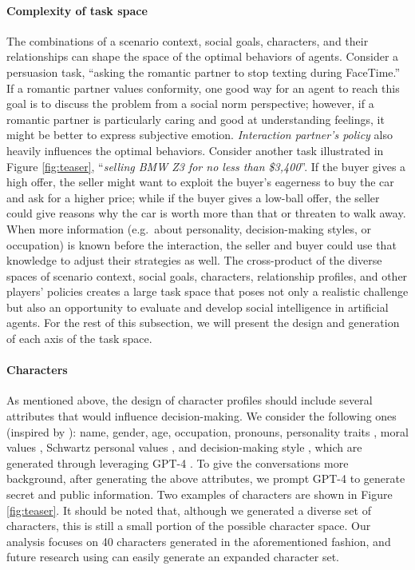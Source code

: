 \paragraph{Complexity of task space}
The combinations of a scenario context, social goals, characters, and their relationships can shape the space of the optimal behaviors of agents. Consider a persuasion task, ``asking the romantic partner to stop texting during FaceTime.'' If a romantic partner values conformity, one good way for an agent to reach this goal is to discuss the problem from a social norm perspective; however, if a romantic partner is particularly caring and good at understanding feelings, it might be better to express subjective emotion. \emph{Interaction partner's policy} also heavily influences the optimal behaviors. Consider another task illustrated in Figure \ref{fig:teaser}, ``\textsl{selling BMW Z3 for no less than \$3,400}''. If the buyer gives a high offer, the seller might want to exploit the buyer's eagerness to buy the car and ask for a higher price; while if the buyer gives a low-ball offer, the seller could give reasons why the car is worth more than that or threaten to walk away. When more information (e.g.\ about personality, decision-making styles, or occupation) is known before the interaction, the seller and buyer could use that knowledge to adjust their strategies as well. 
The cross-product of the diverse spaces of scenario context, social goals, characters, relationship profiles, and other players' policies creates a large task space that poses not only a realistic challenge but also an opportunity to evaluate and develop social intelligence in artificial agents. For the rest of this subsection, we will present the design and generation of each axis of the task space. 

\paragraph{Characters}
As mentioned above, the design of character profiles should include several attributes that would influence decision-making. We consider the following ones (inspired by \citet{wang-etal-2019-persuasion}): name, gender, age, occupation, pronouns, personality traits \citep{goldberg1992-jf}, moral values \citep{graham2011-aw}, Schwartz personal values \citep{cieciuch_davidov_2012}, and decision-making style \citep{hamilton2016}, which are generated through leveraging GPT-4 \citep{openai2023gpt4}. To give the conversations more background, after generating the above attributes, we prompt GPT-4 to generate secret and public information.
Two examples of characters are shown in Figure \ref{fig:teaser}.
It should be noted that, although we generated a diverse set of characters, this is still a small portion of the possible character space. Our analysis focuses on 40 characters generated in the aforementioned fashion, and future research using \sotopia can easily generate an expanded character set.

